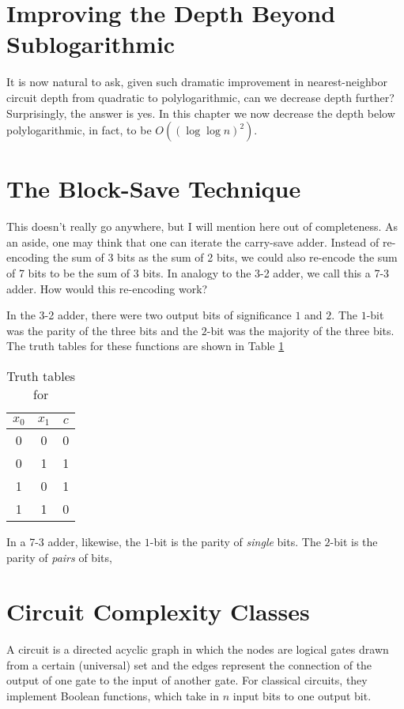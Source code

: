 \section{Improving the Depth Beyond Sublogarithmic}

It is now natural to ask, given such dramatic improvement in
nearest-neighbor circuit
depth from quadratic \cite{Kutin2006} to polylogarithmic, can we
decrease depth further? Surprisingly, the answer is yes. In this
chapter we now decrease the depth below polylogarithmic, in fact,
to be $O((\log \log n)^2)$.

\section{The Block-Save Technique}

This doesn't really go anywhere, but I will mention here out of
completeness.
As an aside, one may think that one can iterate the carry-save
adder. Instead of re-encoding the sum of 3 bits as the sum of
2 bits, we could also re-encode the sum of 7 bits to be the
sum of 3 bits. In analogy to the 3-2 adder, we call this a 7-3 adder.
How would this re-encoding work?

In the 3-2 adder, there were two output bits of significance $1$
and $2$. The $1$-bit was the parity of the three bits and
the $2$-bit was the majority of the three bits. The truth tables
for these functions are shown in Table \ref{tab:3-2}

\begin{table}
\begin{tabular}{cc|c}
\hline
$x_0$ & $x_1$ & $c$ \\
\hline
0 & 0 & 0 \\
0 & 1 & 1 \\
1 & 0 & 1 \\
1 & 1 & 0 \\
\hline
\end{tabular}
\caption{Truth tables for}
\label{tab:3-2}
\end{table}

 In a 7-3 adder,
likewise, the $1$-bit is the parity of \emph{single} bits.
The $2$-bit is the parity of \emph{pairs} of bits, 

\section{Circuit Complexity Classes}

A circuit is a directed acyclic graph in which the nodes are
logical gates drawn from a certain (universal) set and the edges 
represent
the connection of the output of one gate to the input of another
gate. For classical circuits, they implement Boolean functions, which take in $n$ input
bits to one output bit.

